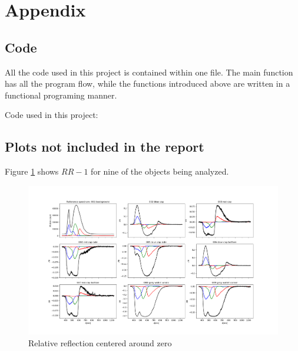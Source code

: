 \section{Appendix}


\subsection{Code}
\label{sec:appendix_code}
All the code used in this project is contained within one file. The main function has all the program flow, while the functions introduced above are written in a functional programing manner. 

Code used in this project: 



\subsection{Plots not included in the report}
\label{sec:appendix_plots}



Figure \ref{fig:relative_reflection_around_zero} shows $RR-1$ for nine of the objects being analyzed. 
\begin{landscape}
\begin{figure}[t]
    \centering
    \includegraphics[width=1\paperwidth]{Plots/relative_reflectance_around_zero_with_qe_color_response.png}
    \caption{Relative reflection centered around zero}
    \label{fig:relative_reflection_around_zero}
\end{figure}
\end{landscape}


